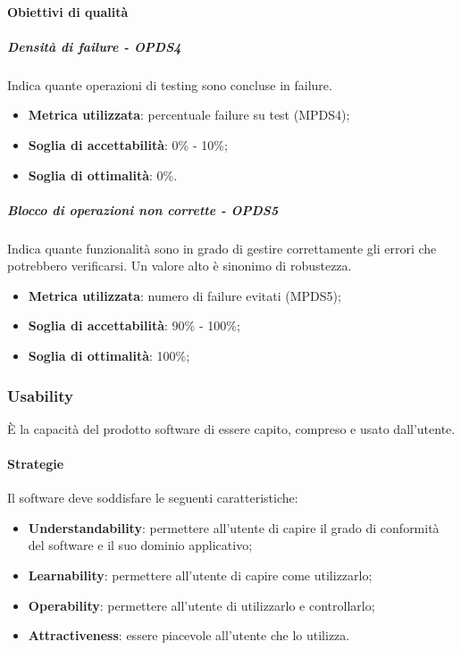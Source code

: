 \documentclass[PdQ.tex]{subfiles}
\begin{document}
			\paragraph{Obiettivi di qualità}
				\subparagraph{Densità di failure - OPDS4}
				Indica quante operazioni di testing sono concluse in failure.
				\begin{itemize}
					\item \textbf{Metrica utilizzata}: percentuale failure su test (MPDS4);
					\item \textbf{Soglia di accettabilità}: 0\% - 10\%;
					\item \textbf{Soglia di ottimalità}: 0\%.
				\end{itemize}

				\subparagraph{Blocco di operazioni non corrette - OPDS5}
				Indica quante funzionalità sono in grado di gestire correttamente gli errori che potrebbero verificarsi. Un valore alto è sinonimo di robustezza.
				\begin{itemize}
					\item \textbf{Metrica utilizzata}: numero di failure evitati (MPDS5);
					\item \textbf{Soglia di accettabilità}: 90\% - 100\%;
					\item \textbf{Soglia di ottimalità}: 100\%;
				\end{itemize}

		\subsubsection{Usability}
		È la capacità del prodotto software di essere capito, compreso e usato dall'utente.

			\paragraph{Strategie}
			Il software deve soddisfare le seguenti caratteristiche:
			\begin{itemize}
				\item \textbf{Understandability}: permettere all'utente di capire il grado di conformità del software e il suo dominio applicativo;
				\item \textbf{Learnability}: permettere all'utente di capire come utilizzarlo;
				\item \textbf{Operability}: permettere all'utente di utilizzarlo e controllarlo;
				\item \textbf{Attractiveness}: essere piacevole all'utente che lo utilizza.
			\end{itemize}
\end{document}

